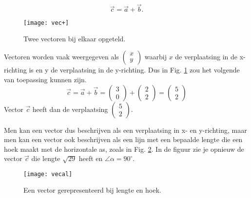 \documentclass[11pt,fleqn]{book} %
\begin{document}
\begin{displaymath}
	\vec{c}=\vec{a}+\vec{b}.
\end{displaymath}

\begin{figure}[h]
	\centering\texttt{[image: vec+]}
	\caption{Twee vectoren bij elkaar opgeteld.}
	\label{fig:vec+}
\end{figure}

Vectoren worden vaak weergegeven als $\begin{pmatrix}x \\ y\end{pmatrix}$ waarbij $x$ de verplaatsing in de x-richting is en y de verplaatsing in de y-richting. Dus in Fig. \ref{fig:vec+} zou het volgende van toepassing kunnen zijn.
\begin{displaymath}
	\vec{c}=\vec{a}+\vec{b}=\begin{pmatrix}3 \\ 0\end{pmatrix}+\begin{pmatrix}2 \\ 2\end{pmatrix}=\begin{pmatrix}5 \\ 2\end{pmatrix}
\end{displaymath}
Vector $\vec{c}$ heeft dan de verplaatsing $\begin{pmatrix}5 \\ 2\end{pmatrix}$.

Men kan een vector dus beschrijven als een verplaatsing in x- en y-richting, maar men kan een vector ook beschrijven als een lijn met een bepaalde lengte die een hoek maakt met de horizontale as, zoals in Fig. \ref{fig:vecal}. In de figuur zie je opnieuw de vector $\vec{c}$ die lengte $\sqrt{29}$ heeft en $\angle \alpha = 90^\circ$.

\begin{figure}[h]
	\centering\texttt{[image: vecal]}
	\caption{Een vector gerepresenteerd bij lengte en hoek.}
	\label{fig:vecal}
\end{figure}
\end{document}
